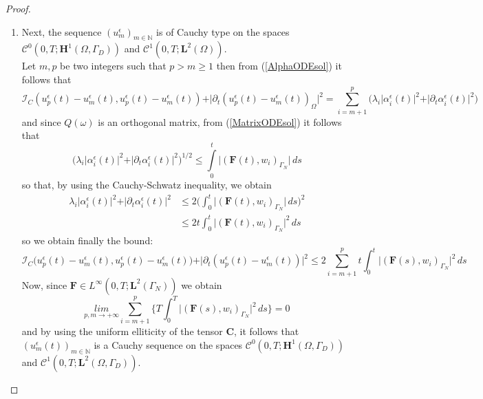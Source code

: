 \begin{proof}
\begin{enumerate}
    \item Next, the sequence $(u^{\epsilon}_m)_{m \in \mathbb{N}}$ is of Cauchy type on the spaces $\mathcal{C}^0(0,T;\mathbf{H}^1(\Omega, \Gamma_D))$ and $\mathcal{C}^1(0,T; \mathbf{L}^2(\Omega))$.\\
    Let $m,p$ be two integers such that $p > m \geq 1$ then from (\ref{AlphaODEsol}) it follows that
    \begin{equation*}
        \mathcal{I}_C(u_p^{\epsilon}(t)- u_m^{\epsilon}(t),u_p^{\epsilon}(t)- u_m^{\epsilon}(t)) + \vert \partial_t (u_p^{\epsilon}(t)- u_m^{\epsilon}(t))_{\Omega} \vert^2 = \sum_{i=m+1}^p \big( \lambda_i \vert \alpha_i^{\epsilon}(t) \vert^2 + \vert \partial_t \alpha_i^{\epsilon}(t) \vert^2 \big) 
    \end{equation*}
    and since $Q(\omega)$ is an orthogonal matrix, from (\ref{MatrixODEsol}) it follows that
    \begin{equation}
        \label{AlphaBound}
        \big( \lambda_i \vert \alpha_i^{\epsilon}(t) \vert^2 + \vert \partial_t \alpha_i^{\epsilon}(t) \vert^2 \big)^{1/2} \leq \int \limits_0^t \vert (\mathbf{F}(t),w_i)_{\Gamma_N} \vert \, ds 
    \end{equation}
    so that, by using the Cauchy-Schwatz inequality, we obtain
    \begin{align*}
        \lambda_i \vert \alpha_i^{\epsilon}(t) \vert^2 + \vert \partial_t \alpha_i^{\epsilon}(t) \vert^2 &\leq 2 \big( \int_0^t \vert (\mathbf{F}(t),w_i)_{\Gamma_N} \vert \, ds \big)^2 \\
        & \leq  2 t \int_0^t \vert (\mathbf{F}(t),w_i)_{\Gamma_N} \vert^2 \, ds
    \end{align*}
    so we obtain finally the bound:
    \begin{equation*}
        \mathcal{I}_C \big(u_p^{\epsilon}(t) - u_m^{\epsilon}(t),u_p^{\epsilon}(t) - u_m^{\epsilon}(t) \big) + \vert \partial_t (u_p^{\epsilon}(t) - u_m^{\epsilon}(t)) \vert^2 \leq 2 \sum_{i=m+1}^p t \int_0^t \vert (\mathbf{F}(s),w_i)_{\Gamma_N} \vert^2 \, ds
    \end{equation*}
    Now, since $\mathbf{F} \in L^{\infty}(0,T;\mathbf{L}^2( \Gamma_N))$ we obtain
    \begin{equation*}
        \underset{p,m \longrightarrow + \infty}{lim} \sum_{i=m+1}^p \big \{ T \int_0^T \vert (\mathbf{F}(s),w_i)_{\Gamma_N}\vert^2 \, ds \big \} = 0
    \end{equation*}
    and by using the uniform elliticity of the tensor $\mathbf{C}$, it follows that $(u_m^{\epsilon}(t))_{m \in \mathbb{N}}$ is a Cauchy sequence on the spaces $\mathcal{C}^0(0,T; \mathbf{H}^1(\Omega, \Gamma_D))$ and $\mathcal{C}^1(0,T; \mathbf{L}^2(\Omega, \Gamma_D))$.
    

\end{enumerate}
\end{proof}
